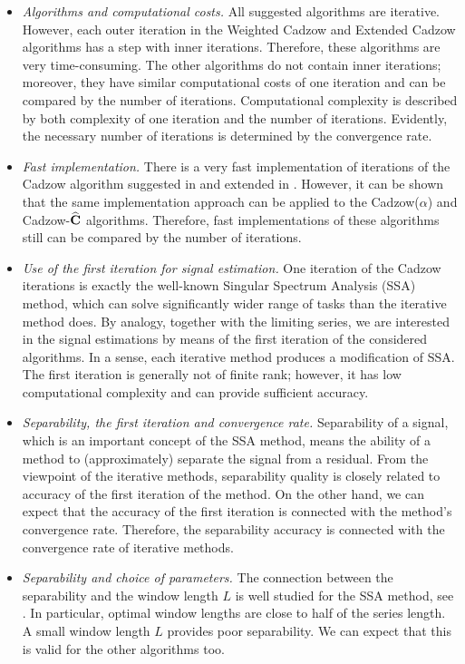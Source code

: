 \documentclass[sii]{ipart}
\begin{document}
\begin{itemize}
		\item \textit{Algorithms and computational costs.}
		All suggested algorithms are iterative. However, each outer iteration in the Weighted Cadzow and Extended Cadzow algorithms has a step with inner iterations. Therefore, these algorithms are very time-consuming. The other algorithms do not contain inner iterations; moreover, they have similar computational costs of one iteration and can be compared by the number of iterations.
		Computational complexity is described by both complexity of one iteration and the number of iterations. Evidently, the necessary number of iterations is determined by the convergence rate.
\item \textit{Fast implementation.}
There is a very fast implementation of iterations of the Cadzow algorithm suggested in \cite{Korobeynikov2010} and extended in \cite{Golyandina.etal2015}. However, it can be shown that the same implementation approach can be applied to the Cadzow($\alpha$) and Cadzow-$\widehat{\mathbf{C}}$ algorithms. Therefore, fast implementations of these algorithms still can be compared by the number of iterations.
		\item \textit{Use of the first iteration for signal estimation.}
		One iteration of the Cadzow iterations is exactly the well-known Singular Spectrum Analysis (SSA) method, which can solve significantly wider range of tasks than the iterative method does. By analogy, together with the limiting series, we are interested in the signal estimations by means of the first iteration of the considered algorithms. In a sense, each iterative method produces a modification of SSA. The first iteration is generally not of finite rank; however, it has low computational complexity and can provide sufficient accuracy.
		\item \textit{Separability, the first iteration and convergence rate.}
		Separability of a signal, which is an important concept of the SSA method, means the ability of a method to (approximately) separate the signal from a residual. From the viewpoint of the iterative methods,  separability quality is closely related to accuracy of the first iteration of the method. On the other hand, we can expect that the accuracy of the first iteration is connected with the method's convergence rate. Therefore, the separability accuracy is connected with the convergence rate of iterative methods.
		\item \textit{Separability and choice of parameters.}
		The connection between the separability and the window length $L$ is well studied for the SSA method, see \cite{Golyandina2010}. In particular, optimal window lengths are close to half of the series length. A small window length $L$ provides poor separability. We can expect that this is valid for the other algorithms too.

\end{itemize}
\end{document}

